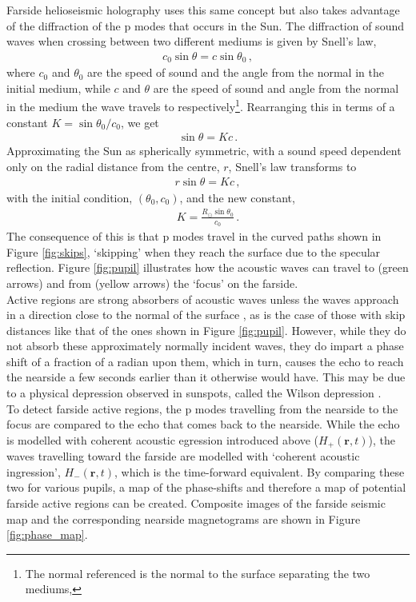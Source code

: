 \documentclass[11pt,a4paper,onecolumn]{report}
\begin{document}
Farside helioseismic holography uses this same concept but also takes advantage of
the diffraction of the p modes that occurs in the Sun. The diffraction of sound
waves when crossing between two different mediums is given by Snell's law,
\begin{align}
  c_0 \sin \theta = c \sin \theta_0 \,,
\end{align}
where \(c_0\) and \(\theta_0\) are the speed of sound and the angle from the normal
in the initial medium, while \(c\) and \(\theta\) are the speed of sound and
angle from the normal in the medium the wave travels to
respectively\footnote{The normal referenced is the normal to the surface
separating the two mediums,}. Rearranging this in terms of a constant \(K = \sin
\theta_0 / c_0 \), we get
\begin{align}
  \sin \theta = Kc \,.
\end{align}
Approximating the Sun as spherically symmetric, with a sound speed dependent
only on the radial distance from the centre, \(r\), Snell's law transforms to
\begin{align}
  r\sin \theta = Kc \,,
\end{align}
with the initial condition, \((\theta_0, c_0)\), and the new constant,
\begin{align}
  K = \frac{R_\odot \sin \theta_0}{c_0}\,.
\end{align}
The consequence of this is that p modes travel in the curved paths shown in
Figure \ref{fig:skips}, `skipping' when they reach the surface due to the
specular reflection. Figure \ref{fig:pupil} illustrates how the acoustic waves
can travel to (green arrows) and from (yellow arrows) the `focus' on the
farside. \\

Active regions are strong absorbers of acoustic waves unless the waves approach
in a direction close to the normal of the surface \citep{Braun1989,
lindsey_seismic_2000, braun_surface-focused_2008}, as is the case of those with
skip distances like that of the ones shown in Figure \ref{fig:pupil}. However,
while they do not absorb these approximately normally incident waves, they do
impart a phase shift of a fraction of a radian upon them, which in turn, causes
the echo to reach the nearside a few seconds earlier than it otherwise would
have. This may be due to a physical depression observed in sunspots, called
the Wilson depression \citep{Lindsey_2010}.\\

To detect farside active regions, the p modes travelling
from the nearside to the focus are compared to the echo that comes back to the
nearside. While the echo is modelled with coherent acoustic egression introduced
above (\(H_+(\bm{r}, t)\)), the waves travelling toward the farside are modelled with
`coherent acoustic ingression', \(H_-(\bm{r}, t)\), which is the time-forward
equivalent. By comparing these two for various pupils, a map of the phase-shifts
and therefore a map of potential farside active regions can be created.
Composite images of the farside seismic map and the corresponding nearside
magnetograms are shown in Figure \ref{fig:phase_map}.\\
\end{document}
